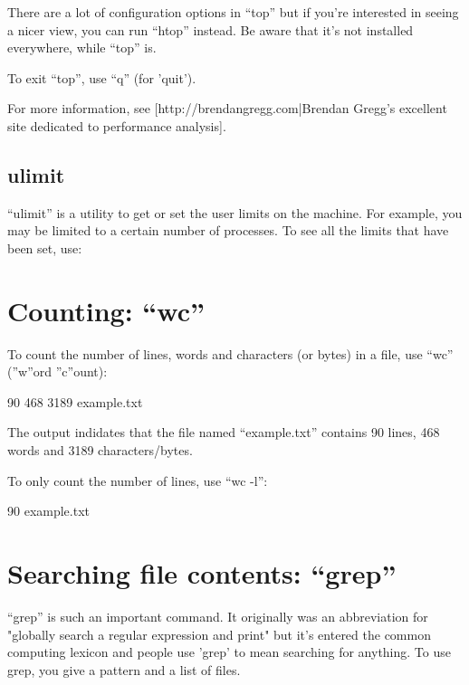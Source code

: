 There are a lot of configuration options in ``top'' but if you're interested in seeing a nicer view, you can run ``htop'' instead. Be aware that it's not installed everywhere, while ``top'' is.

To exit ``top'', use ``q'' (for 'quit').

For more information, see [http://brendangregg.com|Brendan Gregg's excellent site dedicated to performance analysis].

\subsection{ulimit}
``ulimit'' is a utility to get or set the user limits on the machine. For example, you may be limited to a certain number of processes. To see all the limits that have been set, use:

\begin{prompt}
\end{prompt}

\section{Counting: ``wc''}

To count the number of lines, words and characters (or bytes) in a file, use ``wc'' (''w''ord ''c''ount):

\begin{prompt}
      90     468    3189  example.txt
\end{prompt}

The output indidates that the file named ``example.txt'' contains 90 lines, 468 words and 3189 characters/bytes.

To only count the number of lines, use ``wc -l'':

\begin{prompt}
      90    example.txt
\end{prompt}

\section{Searching file contents: ``grep''}
``grep'' is such an important command. It originally was an abbreviation for "globally search a regular expression and print" but it's entered the common computing lexicon and people use 'grep' to mean searching for anything. To use grep, you give a pattern and a list of files. 

